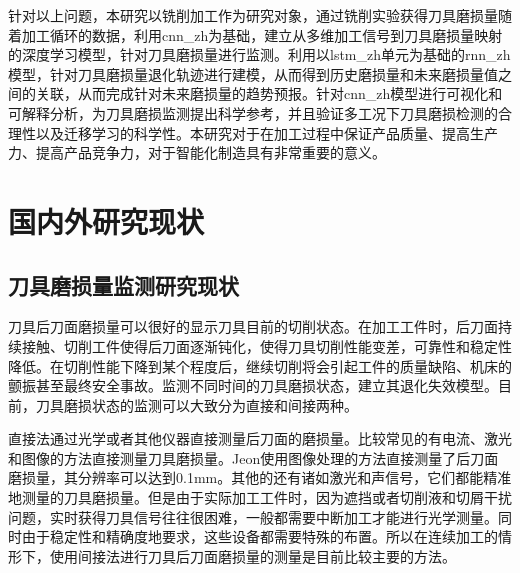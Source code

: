 针对以上问题，本研究以铣削加工作为研究对象，通过铣削实验获得刀具磨损量随着加工循环的数据，利用\gls{cnn_zh}为基础，建立从多维加工信号到刀具磨损量映射的深度学习模型，针对刀具磨损量进行监测。利用以\gls{lstm_zh}单元为基础的\gls{rnn_zh}模型，针对刀具磨损量退化轨迹进行建模，从而得到历史磨损量和未来磨损量值之间的关联，从而完成针对未来磨损量的趋势预报。针对\gls{cnn_zh}模型进行可视化和可解释分析，为刀具磨损监测提出科学参考，并且验证多工况下刀具磨损检测的合理性以及迁移学习的科学性。本研究对于在加工过程中保证产品质量、提高生产力、提高产品竞争力，对于智能化制造具有非常重要的意义。

\section{国内外研究现状}

\subsection{刀具磨损量监测研究现状}

刀具后刀面磨损量可以很好的显示刀具目前的切削状态。在加工工件时，后刀面持续接触、切削工件使得后刀面逐渐钝化，使得刀具切削性能变差，可靠性和稳定性降低。在切削性能下降到某个程度后，继续切削将会引起工件的质量缺陷、机床的颤振甚至最终安全事故。监测不同时间的刀具磨损状态，建立其退化失效模型。目前，刀具磨损状态的监测可以大致分为直接和间接两种。

直接法通过光学或者其他仪器直接测量后刀面的磨损量。比较常见的有电流、激光和图像的方法直接测量刀具磨损量。Jeon\cite{jeon1988optical}使用图像处理的方法直接测量了后刀面磨损量，其分辨率可以达到0.1mm。其他的还有诸如激光和声信号\cite{giardini1996neural,shahabi2009cycle,xiong2011cutting}，它们都能精准地测量的刀具磨损量。但是由于实际加工工件时，因为遮挡或者切削液和切屑干扰问题，实时获得刀具信号往往很困难，一般都需要中断加工才能进行光学测量。同时由于稳定性和精确度地要求，这些设备都需要特殊的布置。所以在连续加工的情形下，使用间接法进行刀具后刀面磨损量的测量是目前比较主要的方法。

